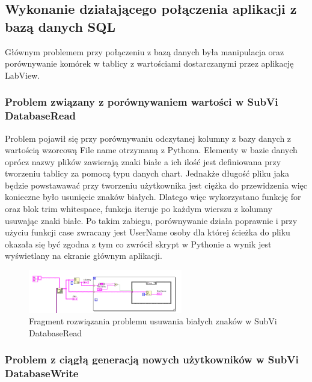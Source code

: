 \documentclass{report}
\begin{document}
\subsection{\Large Wykonanie działającego połączenia aplikacji z bazą danych SQL}

%
%

Głównym problemem przy połączeniu z bazą danych była manipulacja oraz porównywanie komórek w tablicy z wartościami dostarczanymi przez aplikację LabView.

\subsubsection{\large Problem związany z porównywaniem wartości w SubVi DatabaseRead}
Problem pojawił się przy porównywaniu odczytanej kolumny z bazy danych z wartością wzorcową File name otrzymaną z Pythona. Elementy w bazie danych oprócz nazwy plików zawierają znaki białe a ich ilość
jest definiowana przy tworzeniu tablicy za pomocą typu danych chart. Jednakże długość pliku jaka będzie powstawawać przy tworzeniu użytkownika jest ciężka do przewidzenia więc konieczne było
usunięcie znaków białych. Dlatego więc wykorzystano funkcję for oraz blok trim whitespace, funkcja iteruje po każdym wierszu z kolumny usuwając znaki białe.
Po takim zabiegu, porównywanie działa poprawnie i przy użyciu funkcji case zwracany jest UserName osoby dla której ścieżka do pliku okazała się być zgodna z tym co zwrócił skrypt w Pythonie a
wynik jest wyświetlany na ekranie głównym aplikacji.

\begin{figure}[H]
    \centering
    \includegraphics[width=0.6\textwidth]{src/Database/Fragment_DatabaseRead.png}
    \caption{Fragment rozwiązania problemu usuwania białych znaków w SubVi DatabaseRead}
    \label{fig:tab-control-page}
\end{figure}

\subsubsection{\large Problem z ciągłą generacją nowych użytkowników w SubVi DatabaseWrite}
\end{document}
